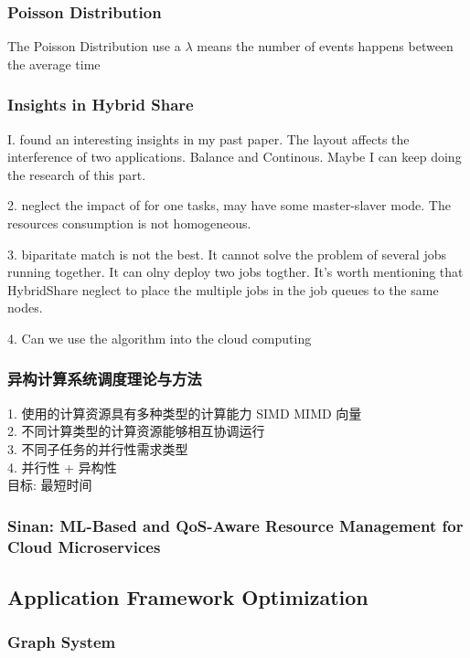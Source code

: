 \documentclass[UTF8]{article}
\begin{document}
\subsubsection{Poisson Distribution}
The Poisson Distribution use a $\lambda$ means the number of events happens between the average time 

\subsubsection{Insights in Hybrid Share}

I. found an interesting insights in my past paper. The layout affects the interference of two applications. Balance and Continous. Maybe I can keep doing the research of this part.

2. neglect the impact of for one tasks, may have some master-slaver mode. The resources consumption is not homogeneous.

3. biparitate match is not the best. It cannot solve the problem of several jobs running together. It can olny deploy two jobs togther. It's worth mentioning that HybridShare neglect to place the multiple jobs in the job queues to the same nodes.

4. Can we use the algorithm into the cloud computing

\subsubsection{异构计算系统调度理论与方法}
1. 使用的计算资源具有多种类型的计算能力 SIMD MIMD 向量 \\
2. 不同计算类型的计算资源能够相互协调运行 \\
3. 不同子任务的并行性需求类型 \\
4. 并行性 + 异构性 \\
目标: 最短时间

\subsubsection{Sinan: ML-Based and QoS-Aware Resource Management for Cloud Microservices}


\subsection{Application Framework Optimization}
\subsubsection{Graph System}
\end{document}
